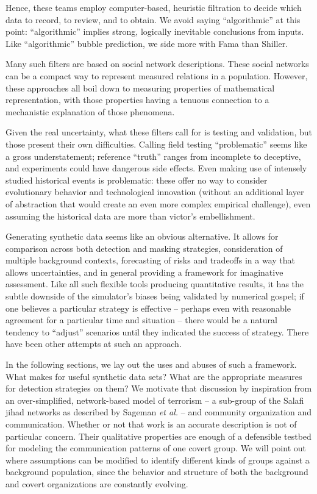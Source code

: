 \documentclass{article}
\begin{document}
Hence, these teams employ computer-based, heuristic filtration to decide which data to record, to review, and to obtain.  We avoid saying ``algorithmic'' at this point: ``algorithmic'' implies strong, logically inevitable conclusions from inputs.  Like ``algorithmic'' bubble prediction, we side more with Fama than Shiller.

Many such filters are based on social network descriptions.  These social networks can be a compact way to represent measured relations in a population.  However, these approaches all boil down to measuring properties of mathematical representation, with those properties having a tenuous connection to a mechanistic explanation of those phenomena.

Given the real uncertainty, what these filters call for is testing and validation, but those present their own difficulties.  Calling field testing ``problematic'' seems like a gross understatement; reference ``truth'' ranges from incomplete to deceptive, and experiments could have dangerous side effects.  Even making use of intensely studied historical events is problematic: these offer no way to consider evolutionary behavior and technological innovation (without an additional layer of abstraction that would create an even more complex empirical challenge), even assuming the historical data are more than victor's embellishment.

Generating synthetic data seems like an obvious alternative.  It allows for comparison across both detection and masking strategies, consideration of multiple background contexts, forecasting of risks and tradeoffs in a way that allows uncertainties, and in general providing a framework for imaginative assessment.  Like all such flexible tools producing quantitative results, it has the subtle downside of the simulator's biases being validated by numerical gospel; if one believes a particular strategy is effective -- perhaps even with reasonable agreement for a particular time and situation -- there would be a natural tendency to ``adjust'' scenarios until they indicated the success of strategy.  There have been other attempts at such an approach\cite{carley2003dynamic}.

In the following sections, we lay out the uses and abuses of such a framework.  What makes for useful synthetic data sets?  What are the appropriate measures for detection strategies on them?  We motivate that discussion by inspiration from an over-simplified, network-based model of terrorism -- a sub-group of the Salafi jihad networks as described by Sageman {\em et al.}\cite{sageman} -- and community organization and communication.  Whether or not that work is an accurate description is not of particular concern.  Their qualitative properties are enough of a defensible testbed for modeling the communication patterns of one covert group.  We will point out where assumptions can be modified to identify different kinds of groups against a background population, since the behavior and structure of both the background and covert organizations are constantly evolving. 
\end{document}
